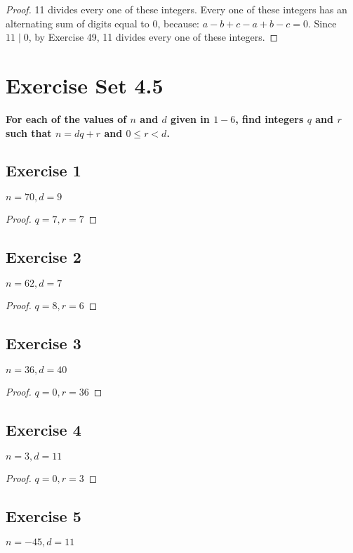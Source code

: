 \documentclass[14pt]{extarticle}
\newcommand{\cy}{\color{cyan}}
\begin{document}
\begin{proof}
    11 divides every one of these integers. Every one of these integers has an alternating sum of digits equal to 0, because: $a - b + c - a + b - c = 0$. Since $11 \mid 0$, by Exercise 49, 11 divides every one of these integers.
\end{proof}

\section{Exercise Set 4.5}

 {\bf \cy For each of the values of $n$ and $d$ given in $1-6$, find integers $q$ and $r$ such that $n = dq + r$ and $0 \leq r < d$.}

\subsection{Exercise 1}
$n = 70, d = 9$

\begin{proof}
    $q = 7, r = 7$
\end{proof}

\subsection{Exercise 2}
$n = 62, d = 7$

\begin{proof}
    $q = 8, r = 6$
\end{proof}

\subsection{Exercise 3}
$n = 36, d = 40$

\begin{proof}
    $q = 0, r = 36$
\end{proof}

\subsection{Exercise 4}
$n = 3, d = 11$

\begin{proof}
    $q = 0, r = 3$
\end{proof}

\subsection{Exercise 5}
$n = -45, d = 11$
\end{document}
